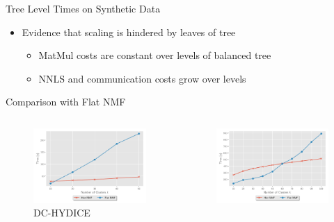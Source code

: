 \documentclass{beamer}
\begin{document}
\begin{frame}{Tree Level Times on Synthetic Data}
\vfill
    
\begin{itemize}
    \item Evidence that scaling is hindered by leaves of tree
    \begin{itemize}
    	\item MatMul costs are constant over levels of balanced tree 
	\item NNLS and communication costs grow over levels
    \end{itemize}
\end{itemize}
    
\end{frame}

\begin{frame}{Comparison with Flat NMF}
    \centering
    \begin{columns}
        \begin{column}{0.5\textwidth}
            \begin{figure}
            \includegraphics[width=\textwidth]{../plots/dc_rankscaling.pdf}
            \caption{DC-HYDICE}
            \end{figure}
        \end{column}
        \begin{column}{0.5\textwidth}
            \begin{figure}
            \includegraphics[width=\textwidth]{../plots/synthetic_rankscaling.pdf}

\end{figure}
\end{column}
\end{columns}
\end{frame}
\end{document}

